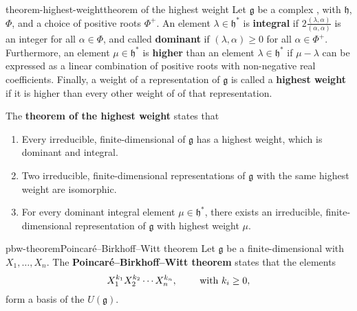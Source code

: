\begin{topic}{theorem-highest-weight}{theorem of the highest weight}
    Let $\mathfrak{g}$ be a complex , with  $\mathfrak{h}$,  $\Phi$, and a choice of positive roots $\Phi^+$. An element $\lambda \in \mathfrak{h}^*$ is \textbf{integral} if $2 \frac{(\lambda, \alpha)}{(\alpha, \alpha)}$ is an integer for all $\alpha \in \Phi$, and called \textbf{dominant} if $(\lambda, \alpha) \ge 0$ for all $\alpha \in \Phi^+$. Furthermore, an element $\mu \in \mathfrak{h}^*$ is \textbf{higher} than an element $\lambda \in \mathfrak{h}^*$ if $\mu - \lambda$ can be expressed as a linear combination of positive roots with non-negative real coefficients. Finally, a weight of a representation of $\mathfrak{g}$ is called a \textbf{highest weight} if it is higher than every other weight of of that representation.
    
    The \textbf{theorem of the highest weight} states that
    \begin{enumerate}[label=(\roman*)]
        \item Every irreducible, finite-dimensional  of $\mathfrak{g}$ has a highest weight, which is dominant and integral.
        \item Two irreducible, finite-dimensional representations of $\mathfrak{g}$ with the same highest weight are isomorphic.
        \item For every dominant integral element $\mu \in \mathfrak{h}^*$, there exists an irreducible, finite-dimensional representation of $\mathfrak{g}$ with highest weight $\mu$.
    \end{enumerate}
\end{topic}

\begin{topic}{pbw-theorem}{Poincaré--Birkhoff--Witt theorem}
    Let $\mathfrak{g}$ be a finite-dimensional  with  $X_1, \ldots, X_n$. The \textbf{Poincaré--Birkhoff--Witt theorem} states that the elements
    \[ X_1^{k_1} X_2^{k_2} \cdots X_n^{k_n}, \qquad \textup{ with } k_i \ge 0 ,  \]
    form a basis of the  $U(\mathfrak{g})$.
\end{topic}

